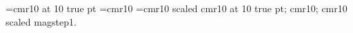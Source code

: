
\nopagenumbers
\magnification {}
\font\cmrxx=cmr10 at 10 true pt
\font\cmrx=cmr10
\font\cmrxbig=cmr10 scaled
\cmrxx cmr10 at 10 true pt;
\cmrx cmr10;
\cmrxbig cmr10 scaled magstep1.
\bye
